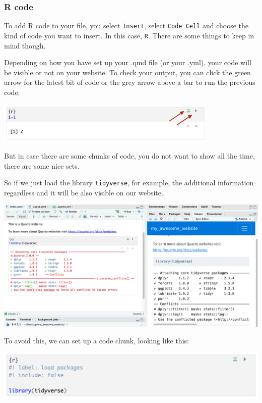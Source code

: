 \documentclass[
  letterpaper,
  DIV=11,
  numbers=noendperiod]{scrreprt}
\begin{document}
\hypertarget{r-code}{%
\subsubsection{R code}\label{r-code}}

To add R code to your file, you select \texttt{Insert}, select
\texttt{Code\ Cell} and choose the kind of code you want to insert. In
this case, \texttt{R}. There are some things to keep in mind though.

Depending on how you have set up your .qmd file (or your .yml), your
code will be visible or not on your website. To check your output, you
can click the green arrow for the latest bit of code or the grey arrow
above a bar to run the previous code.

\includegraphics[width=4.16667in,height=\textheight]{img/quarto_intro/Screenshot 2023-10-11 at 15.04.31.png}

But in case there are some chunks of code, you do not want to show all
the time, there are some nice sets.

So if we just load the library \texttt{tidyverse}, for example, the
additional information regardless and it will be also visible on our
website.

\includegraphics{img/quarto_intro/Screenshot 2023-10-11 at 14.49.43.png}

To avoid this, we can set up a code chunk, looking like this:

\includegraphics{img/quarto_intro/Screenshot 2023-10-11 at 14.55.13.png}
\end{document}
